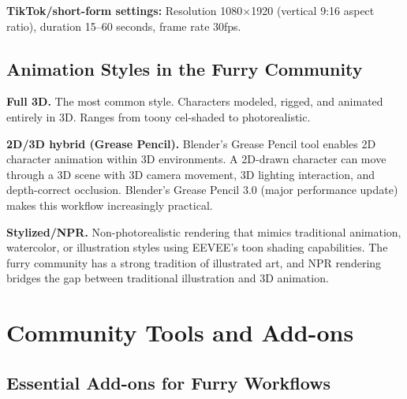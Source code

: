 \textbf{TikTok/short-form settings:} Resolution 1080$\times$1920 (vertical 9:16 aspect ratio), duration 15--60 seconds, frame rate 30fps.


\subsection{Animation Styles in the Furry Community}

\textbf{Full 3D.} The most common style. Characters modeled, rigged, and animated entirely in 3D. Ranges from toony cel-shaded to photorealistic.

\textbf{2D/3D hybrid (Grease Pencil).} Blender's Grease Pencil tool enables 2D character animation within 3D environments. A 2D-drawn character can move through a 3D scene with 3D camera movement, 3D lighting interaction, and depth-correct occlusion. Blender's Grease Pencil 3.0 (major performance update) makes this workflow increasingly practical.

\textbf{Stylized/NPR.} Non-photorealistic rendering that mimics traditional animation, watercolor, or illustration styles using EEVEE's toon shading capabilities. The furry community has a strong tradition of illustrated art, and NPR rendering bridges the gap between traditional illustration and 3D animation.



\section{Community Tools and Add-ons}
\label{sec:furry-tools}

\subsection{Essential Add-ons for Furry Workflows}

